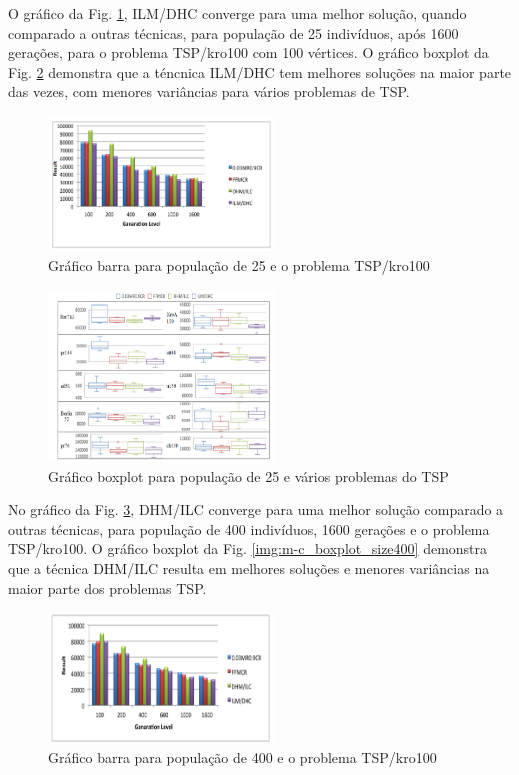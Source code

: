 \documentclass[conference]{IEEEtran}
\begin{document}
O gráfico da Fig. \ref{img:m-c_barra_size25}, ILM/DHC converge para uma melhor solução, quando comparado a outras técnicas, para população de 25 indivíduos, após 1600 gerações, para o problema TSP/kro100 com 100 vértices. O gráfico boxplot da Fig. \ref{img:m-c_boxplot_size25} demonstra que a téncnica ILM/DHC tem melhores soluções na maior parte das vezes, com menores variâncias para vários problemas de TSP. 

\begin{figure}[ht]
\centering
\includegraphics[width=6cm]{m-c_barra_size25.png}
\caption{\label{img:m-c_barra_size25} Gráfico barra para população de 25 e o problema TSP/kro100 } 
\end{figure}

\begin{figure}[ht]
\centering
\includegraphics[width=6cm]{m-c_boxplot_size25.png}
\caption{\label{img:m-c_boxplot_size25} Gráfico boxplot para população de 25 e vários problemas do TSP} 
\end{figure}

No gráfico da Fig. \ref{img:m-c_barra_size400}, DHM/ILC converge para uma melhor solução comparado a outras técnicas, para população de 400 indivíduos, 1600 gerações e o problema TSP/kro100. O gráfico boxplot da Fig. \ref{img:m-c_boxplot_size400} demonstra que a técnica DHM/ILC resulta em melhores soluções e menores variâncias na maior parte dos problemas TSP. 

\begin{figure}[ht]
\centering
\includegraphics[width=6cm]{m-c_barra_size400.png}
\caption{\label{img:m-c_barra_size400} Gráfico barra para população de 400 e o problema TSP/kro100 } 
\end{figure}
\end{document}
